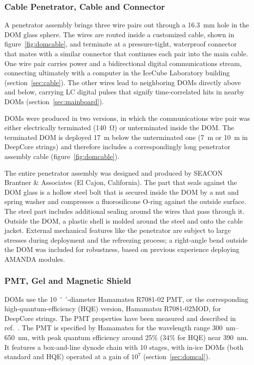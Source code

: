 \subsubsection{\label{sec:penetrator}Cable Penetrator, Cable and Connector}

A penetrator assembly brings three wire pairs out through a \qty{16.3}{mm} hole in
the DOM glass sphere.  The wires are routed inside a customized cable, shown in figure~\ref{fig:domcable},
and terminate at a pressure-tight, waterproof connector that mates with a similar connector
that continues each pair into the main cable.  One wire pair carries power and a
bidirectional digital communications stream, connecting ultimately
with a computer in the
IceCube Laboratory building (section~\ref{sec:cable}).
The other wires lead to neighboring DOMs directly above and below,
carrying LC digital pulses that signify time-correlated hits in nearby DOMs (section~\ref{sec:mainboard}).

DOMs were produced in two versions, in which the communications wire pair was either electrically
terminated (\qty{140}{\ohm}) or unterminated inside the DOM.  The
terminated DOM is deployed \qty{17}{m} below the unterminated one (\qty{7}{m}
or \qty{10}{m} in DeepCore strings) and therefore includes a correspondingly 
long penetrator assembly cable (figure~\ref{fig:domcable}).

The entire penetrator assembly was designed and produced by SEACON Brantner \& Associates (El Cajon,
California).  The part that seals against the DOM glass is a
hollow steel bolt that is secured inside the DOM by a nut and spring
washer and compresses a fluorosilicone O-ring against the outside surface.
The steel part includes additional sealing around the wires that pass
through it.  Outside the DOM, a plastic shell is molded around the steel
and onto the cable jacket.  External mechanical features like the
penetrator are subject to large stresses during deployment and the
refreezing process; a right-angle bend outside the DOM was included for
robustness, based on previous experience deploying AMANDA modules.

\subsubsection{\label{sec:pmt}PMT, Gel and Magnetic Shield}

DOMs use the \SI{10}{''}-diameter Hamamatsu R7081-02 PMT, 
or the corresponding high-quantum-efficiency (HQE) version, Hamamatsu R7081-02MOD, for DeepCore strings.
The PMT properties have been measured and described in ref.~\cite{ICECUBE:PMT}.
The PMT is specified by Hamamatsu for the wavelength range
\qty{300}{nm}--\qty{650}{nm}, with peak quantum efficiency around 25\% (34\%
for HQE) near \qty{390}{nm}.  It features a box-and-line dynode chain with 10 stages,
with in-ice DOMs (both standard and HQE) operated at a gain of $10^7$ (section~\ref{sec:domcal}).

